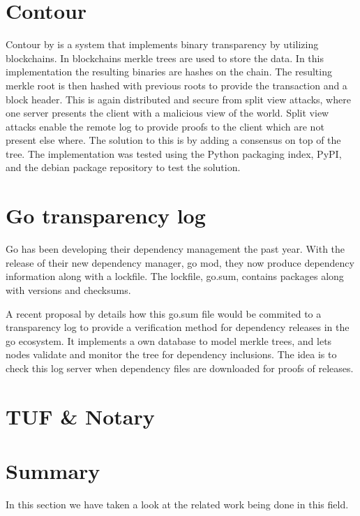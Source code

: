 \documentclass[../Main/thesis.tex]{subfiles}
\begin{document}
\section{Contour}\label{sec:contour}
Contour by \citeauthor{1712.08427v2} is a system that implements binary
transparency by utilizing blockchains. In blockchains merkle trees are used to
store the data. In this implementation the resulting binaries are hashes on the
chain. The resulting merkle root is then hashed with previous roots to provide
the transaction and a block header. This is again distributed and secure from
split view attacks, where one server presents the client with a malicious view
of the world. Split view attacks enable the remote log to provide proofs to the
client which are not present else where. The solution to this is by adding a
consensus on top of the tree. The implementation was tested using the Python
packaging index, PyPI, and the debian package repository to test the solution.\cite{1712.08427v2}


\section{Go transparency log}\label{sec:go-transparency-log}
Go has been developing their dependency management the past year. With the
release of their new dependency manager, go mod, they now produce dependency
information along with a lockfile. The lockfile, go.sum, contains packages along
with versions and checksums.

A recent proposal by \citeauthor{russ-cos-and-filippo-valsorda} details how this
go.sum file would be commited to a transparency log to provide a verification
method for dependency releases in the go ecosystem. It implements a own database
to model merkle trees, and lets nodes validate and monitor the tree for
dependency inclusions. The idea is to check this log server when dependency
files are downloaded for proofs of releases.\cite{russ-cos-and-filippo-valsorda}

\section{TUF \& Notary}\label{sec:tuf}


\section*{Summary}\label{sec:researchoverview-summary}
In this section we have taken a look at the related work being done in this
field.

\blankpage
\end{document}
